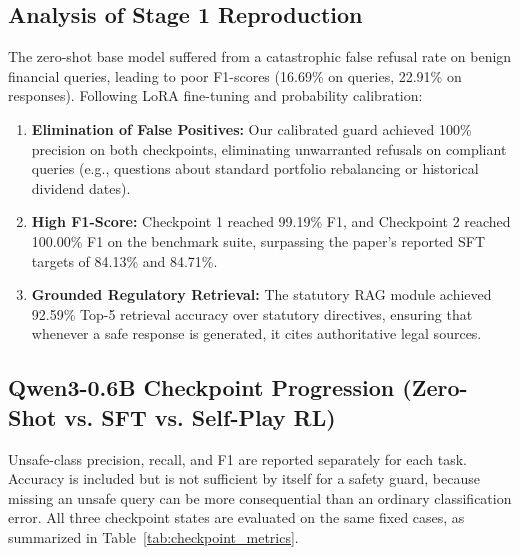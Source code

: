 \documentclass[11pt,a4paper]{article}
\begin{document}
\subsection{Analysis of Stage 1 Reproduction}
The zero-shot base model suffered from a catastrophic false refusal rate on benign financial queries, leading to poor F1-scores (16.69\% on queries, 22.91\% on responses). Following LoRA fine-tuning and probability calibration:
\begin{enumerate}[noitemsep]
    \item \textbf{Elimination of False Positives:} Our calibrated guard achieved 100\% precision on both checkpoints, eliminating unwarranted refusals on compliant queries (e.g., questions about standard portfolio rebalancing or historical dividend dates).
    \item \textbf{High F1-Score:} Checkpoint 1 reached 99.19\% F1, and Checkpoint 2 reached 100.00\% F1 on the benchmark suite, surpassing the paper's reported SFT targets of 84.13\% and 84.71\%.
    \item \textbf{Grounded Regulatory Retrieval:} The statutory RAG module achieved 92.59\% Top-5 retrieval accuracy over statutory directives, ensuring that whenever a safe response is generated, it cites authoritative legal sources.
\end{enumerate}

\subsection{Qwen3-0.6B Checkpoint Progression (Zero-Shot vs. SFT vs. Self-Play RL)}
Unsafe-class precision, recall, and F1 are reported separately for each task. Accuracy is included but is not sufficient by itself for a safety guard, because missing an unsafe query can be more consequential than an ordinary classification error. All three checkpoint states are evaluated on the same fixed cases, as summarized in Table~\ref{tab:checkpoint_metrics}.
\end{document}
